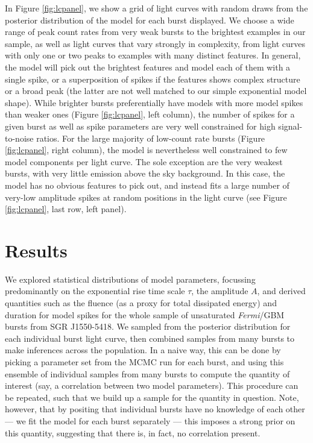 \documentclass[12pt]{emulateapj}
\newcommand{\project}[1]{\textsl{#1}}
\newcommand{\fermi}{\project{Fermi}}
\begin{document}
In Figure \ref{fig:lcpanel}, we show a grid of light curves with random draws from the posterior distribution of the model for each burst displayed. We choose a wide range
of peak count rates from very weak bursts to the brightest examples in our sample, as well as light curves that vary strongly in complexity, from light curves with only one
 or two peaks to examples with many distinct features. In general, the model will pick out the brightest features and model each of them with a single spike, or a superposition of 
 spikes if the features shows complex structure or a broad peak (the latter are not well matched to our simple exponential model shape). While brighter bursts preferentially have
 models with more model spikes than weaker ones (Figure \ref{fig:lcpanel}, left column), the number of spikes for a given burst as well as spike parameters are very well constrained for high signal-to-noise ratios. 
 For the large majority of low-count rate bursts (Figure \ref{fig:lcpanel}, right column), the model is nevertheless well constrained to few model components per light curve. 
 The sole exception are the very weakest bursts, with very little emission above the sky background.
 In this case, the model has no obvious features to pick out, and instead fits a large number of very-low amplitude spikes at random positions in the light curve (see Figure \ref{fig:lcpanel},
 last row, left panel). 
 

\section{Results}
\label{ch6:results}
We explored statistical distributions of model parameters, focussing predominantly on the exponential rise time scale $\tau$, 
the amplitude $A$, and derived quantities such as the fluence (as a proxy for total dissipated energy) and duration for model spikes for
 the whole sample of unsaturated \fermi/GBM bursts from SGR J1550-5418. We sampled from the posterior distribution for each individual burst light curve, then combined
 samples from many bursts to make inferences across the population.
 In a naive way, this can be done by picking a parameter set from the MCMC run for each burst, and using this ensemble of individual samples from many bursts 
to compute the quantity of interest (say, a correlation between two model parameters). This procedure can be repeated, such that we build up a sample
for the quantity in question. Note, however, that by positing that individual bursts have no knowledge of each other --- we fit the model for each burst separately --- 
this imposes a strong prior on this quantity, suggesting that there is, in fact, no correlation present. 
\end{document}
